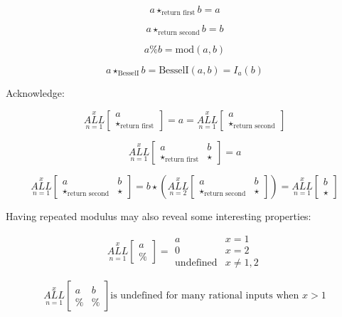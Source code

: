 \documentclass{article}
\begin{document}
$$a \star_{\text{return first}} b = a$$

$$a \star_{\text{return second}} b = b$$

$$a \% b = \text{mod}(a,b)$$

$$a \star_{\text{BesselI}} b = \text{BesselI}(a,b) = I_a(b)$$

Acknowledge:

$$\underset{n=1}{\overset{x}{ALL}} \begin{bmatrix}
a \\
\star_{\text{return first}}
\end{bmatrix} = a = \underset{n=1}{\overset{x}{ALL}} \begin{bmatrix}
a \\
\star_{\text{return second}}
\end{bmatrix}$$

$$\underset{n=1}{\overset{x}{ALL}} \begin{bmatrix}
a & b\\
\star_{\text{return first}} & \star
\end{bmatrix} = a$$

$$\underset{n=1}{\overset{x}{ALL}} \begin{bmatrix}
a & b\\
\star_{\text{return second}} & \star
\end{bmatrix} = b \star (\underset{n=2}{\overset{x}{ALL}} \begin{bmatrix}
a & b\\
\star_{\text{return second}} & \star
\end{bmatrix}) = \underset{n=1}{\overset{x}{ALL}} \begin{bmatrix}
b\\
\star
\end{bmatrix}$$

Having repeated modulus may also reveal some interesting properties:

$$ \underset{n=1}{\overset{x}{ALL}} \begin{bmatrix}
a \\
\%
\end{bmatrix} = \begin{array}{ll} a & x=1 \\ 0 & x=2 \\ \text{undefined} & x \neq 1,2 \end{array} $$

$$ \underset{n=1}{\overset{x}{ALL}} \begin{bmatrix}
a & b  \\
\% & \%
\end{bmatrix} \text{is undefined for many rational inputs when }x > 1$$
\end{document}
